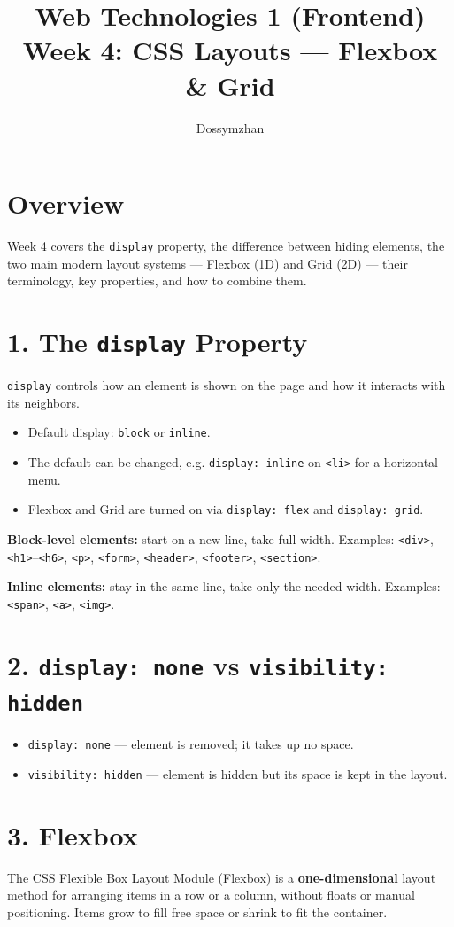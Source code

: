 \documentclass[12pt]{article}
\title{Web Technologies 1 (Frontend) \\ Week 4: CSS Layouts — Flexbox \& Grid}
\author{Dossymzhan}
\date{}
\begin{document}
\maketitle

\section{Overview}
Week 4 covers the \texttt{display} property, the difference between hiding elements, the two main modern layout systems — Flexbox (1D) and Grid (2D) — their terminology, key properties, and how to combine them.

\section{1. The \texttt{display} Property}
\texttt{display} controls how an element is shown on the page and how it interacts with its neighbors.
\begin{itemize}
    \item Default display: \texttt{block} or \texttt{inline}.
    \item The default can be changed, e.g. \texttt{display: inline} on \texttt{<li>} for a horizontal menu.
    \item Flexbox and Grid are turned on via \texttt{display: flex} and \texttt{display: grid}.
\end{itemize}
\textbf{Block-level elements:} start on a new line, take full width. Examples: \texttt{<div>}, \texttt{<h1>}–\texttt{<h6>}, \texttt{<p>}, \texttt{<form>}, \texttt{<header>}, \texttt{<footer>}, \texttt{<section>}.

\textbf{Inline elements:} stay in the same line, take only the needed width. Examples: \texttt{<span>}, \texttt{<a>}, \texttt{<img>}.

\section{2. \texttt{display: none} vs \texttt{visibility: hidden}}
\begin{itemize}
    \item \texttt{display: none} — element is removed; it takes up no space.
    \item \texttt{visibility: hidden} — element is hidden but its space is kept in the layout.
\end{itemize}

\section{3. Flexbox}
The CSS Flexible Box Layout Module (Flexbox) is a \textbf{one-dimensional} layout method for arranging items in a row or a column, without floats or manual positioning. Items grow to fill free space or shrink to fit the container.
\end{document}
